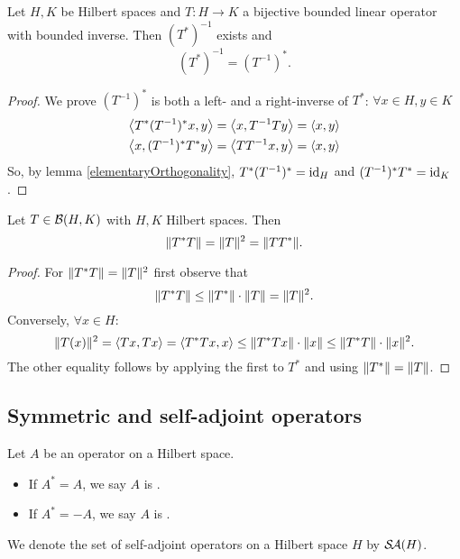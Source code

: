 \begin{proposition}
Let $H,K$ be Hilbert spaces and $T:H\to K$ a bijective bounded linear operator with bounded inverse. Then $(T^*)^{-1}$ exists and
\[ (T^*)^{-1} = (T^{-1})^*. \]
\end{proposition}
\begin{proof}
We prove $(T^{-1})^*$ is both a left- and a right-inverse of $T^*$: $\forall x\in H, y\in K$
\begin{align*}
\left\langle T^*(T^{-1})^*x,y \right\rangle &= \left\langle x,T^{-1}Ty \right\rangle = \left\langle x,y \right\rangle \\
\left\langle x,(T^{-1})^*T^*y \right\rangle &= \left\langle TT^{-1}x,y \right\rangle = \left\langle x,y \right\rangle
\end{align*}
So, by lemma \ref{elementaryOrthogonality}, $T^*(T^{-1})^* = \operatorname{id}_H$ and $(T^{-1})^*T^* = \operatorname{id}_K$.
\end{proof}

\begin{proposition} \label{normOfSquare}
Let $T\in \operatorname{\mathcal{B}}(H,K)$ with $H,K$ Hilbert spaces. Then
\[ \lVert T^*T\rVert= \lVert T\rVert^2 = \lVert TT^*\rVert. \]
\end{proposition}
\begin{proof}
For $\lVert T^*T\rVert= \lVert T\rVert^2$ first observe that
\[ \lVert T^*T\rVert \leq \lVert T^*\rVert\cdot\lVert T\rVert = \lVert T\rVert^2. \]
Conversely, $\forall x\in H$:
\[ \lVert T(x)\rVert^2 = \left\langle Tx,Tx \right\rangle = \left\langle T^*Tx,x \right\rangle \leq \lVert T^*Tx\rVert\cdot \lVert x\rVert \leq \lVert T^*T\rVert\cdot\lVert x\rVert^2. \]
The other equality follows by applying the first to $T^*$ and using $\lVert T^*\rVert=\lVert T\rVert$.
\end{proof}

\subsection{Symmetric and self-adjoint operators}
\begin{definition}
Let $A$ be an operator on a Hilbert space.
\begin{itemize}
\item If $A^* = A$, we say $A$ is .
\item If $A^* = -A$, we say $A$ is .
\end{itemize}
We denote the set of self-adjoint operators on a Hilbert space $H$ by $\mathop{\mathcal{S}\hspace{-0.15em}\mathcal{A}}\nolimits(H)$.
\end{definition}

